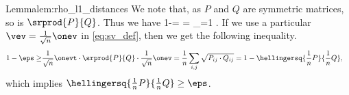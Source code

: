 \begin{prevproof}{Lemma}{lem:rho_l1_distances}
	We note that, as $P$ and $Q$ are symmetric matrices, so is $\srprod{P}{Q}$. Thus we have
	\be
	\label{eq:sv_def}
	1-\eps =  = \max_{\twonorm{\vev}=1} \vevt\circ{}\circ\vev.
	\ee
	If we use a particular $\vev=\frac{1}{\sqrt{n}}\onev$ in \eqref{eq:sv_def}, then we get the following inequality.
	\begin{align*}
	1-\eps \ge & \frac{1}{\sqrt{n}}\onevt\circ\srprod{P}{Q}\circ\frac{1}{\sqrt{n}}\onev = \frac{1}{n}\sum\limits_{i,j} \sqrt{P_{ij}\cdot Q_{ij}} =  1-\hellingersq{\frac{1}{n}P}{\frac{1}{n}Q},
	\end{align*}
	which implies $\hellingersq{\frac{1}{n}P}{\frac{1}{n}Q}\ge\eps$.
\end{prevproof}

